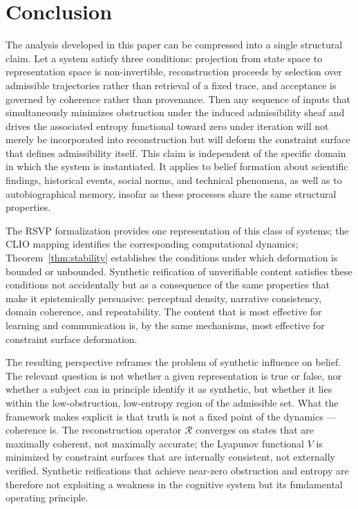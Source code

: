 \documentclass[12pt, a4paper]{article}
\begin{document}
\section{Conclusion}

The analysis developed in this paper can be compressed into a single structural claim. Let a system satisfy three conditions: projection from state space to representation space is non-invertible, reconstruction proceeds by selection over admissible trajectories rather than retrieval of a fixed trace, and acceptance is governed by coherence rather than provenance. Then any sequence of inputs that simultaneously minimizes obstruction under the induced admissibility sheaf and drives the associated entropy functional toward zero under iteration will not merely be incorporated into reconstruction but will deform the constraint surface that defines admissibility itself. This claim is independent of the specific domain in which the system is instantiated. It applies to belief formation about scientific findings, historical events, social norms, and technical phenomena, as well as to autobiographical memory, insofar as these processes share the same structural properties.

The RSVP formalization provides one representation of this class of systems; the CLIO mapping identifies the corresponding computational dynamics; Theorem~\ref{thm:stability} establishes the conditions under which deformation is bounded or unbounded. Synthetic reification of unverifiable content satisfies these conditions not accidentally but as a consequence of the same properties that make it epistemically persuasive: perceptual density, narrative consistency, domain coherence, and repeatability. The content that is most effective for learning and communication is, by the same mechanisms, most effective for constraint surface deformation.

The resulting perspective reframes the problem of synthetic influence on belief. The relevant question is not whether a given representation is true or false, nor whether a subject can in principle identify it as synthetic, but whether it lies within the low-obstruction, low-entropy region of the admissible set. What the framework makes explicit is that truth is not a fixed point of the dynamics --- coherence is. The reconstruction operator $\mathcal{R}$ converges on states that are maximally coherent, not maximally accurate; the Lyapunov functional $V$ is minimized by constraint surfaces that are internally consistent, not externally verified. Synthetic reifications that achieve near-zero obstruction and entropy are therefore not exploiting a weakness in the cognitive system but its fundamental operating principle.
\end{document}

